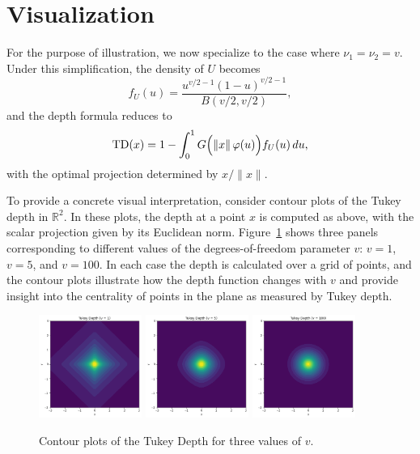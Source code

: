 \section{Visualization}

For the purpose of illustration, we now specialize to the case where \(\nu_1=\nu_2=v\). Under this simplification, the density of \(U\) becomes
\[
f_U(u)=\frac{u^{v/2-1}(1-u)^{v/2-1}}{B(v/2,v/2)},
\]
and the depth formula reduces to
\[
\mathrm{TD}(x)=1-\int_0^1 G\Bigl(\|x\|\,\varphi(u)\Bigr)f_U(u)\,du,
\]
with the optimal projection determined by \(x/\|x\|\).

To provide a concrete visual interpretation, consider contour plots of the Tukey depth in \(\mathbb{R}^2\). In these plots, the depth at a point \(x\) is computed as above, with the scalar projection given by its Euclidean norm. Figure~\ref{fig:TD_contour} shows three panels corresponding to different values of the degrees-of-freedom parameter \(v\): \(v=1\), \(v=5\), and \(v=100\). In each case the depth is calculated over a grid of points, and the contour plots illustrate how the depth function changes with \(v\) and provide insight into the centrality of points in the plane as measured by Tukey depth.

\begin{figure}[htbp]
  \centering
  
  \includegraphics[width=0.3\textwidth]{images/TD_v1.png}
  \hspace{1em}
  \includegraphics[width=0.3\textwidth]{images/TD_v5.png}
  \hspace{1em}
  \includegraphics[width=0.3\textwidth]{images/TD_v100.png}
  
  \caption{Contour plots of the Tukey Depth for three values of \(v\).}
  \label{fig:TD_contour}
\end{figure}